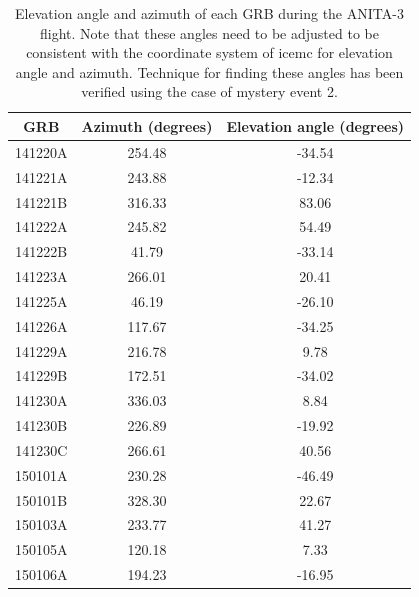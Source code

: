 \begin{table}
\centering
\begin{tabular}{ |c|c|c| } 
\hline
GRB & Azimuth (degrees) & Elevation angle (degrees)\\
\hline
141220A	& 254.48 & -34.54\\
\color{red} {141221A}	& 243.88 & -12.34 \\
141221B	& 316.33 & 83.06\\
141222A	& 245.82 & 54.49\\
141222B	& 41.79 & -33.14\\
141223A	& 266.01 & 20.41\\
141225A	& 46.19 & -26.10\\
141226A	& 117.67 & -34.25\\
\color{red} {141229A}	& 216.78 & 9.78 \\
141229B	& 172.51 & -34.02\\
\color{red} {141230A}	& 336.03 & 8.84 \\
141230B	& 226.89 & -19.92\\
141230C	& 266.61 & 40.56\\
150101A	& 230.28 & -46.49\\
150101B	& 328.30 & 22.67\\
150103A	& 233.77 & 41.27\\
\color{red} {150105A}	& 120.18 & 7.33 \\
150106A	& 194.23 & -16.95\\
\hline
\end{tabular}
\caption{Elevation angle and azimuth of each GRB during the ANITA-3 flight. Note that these angles need to be adjusted to be consistent with the coordinate system of icemc for elevation angle and azimuth. Technique for finding these angles has been verified using the case of mystery event 2.}
\label{alt_az}
\end{table}

